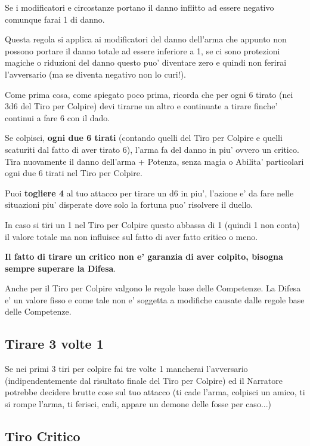 \documentclass[a4paper,11pt,twoside,openany]{book}
\begin{document}
Se i modificatori e circostanze portano il danno inflitto ad essere negativo comunque farai 1 di danno.

Questa regola si applica ai modificatori del danno dell'arma che appunto non possono portare il danno totale ad essere inferiore a 1, se ci sono protezioni magiche o riduzioni del danno questo puo' diventare zero e quindi non ferirai l'avversario (ma se diventa negativo non lo curi!).

Come prima cosa, come spiegato poco prima, ricorda che per ogni 6 tirato (nei 3d6 del Tiro per Colpire) devi tirarne un altro e continuate a tirare finche' continui a fare 6 con il dado.

Se colpisci, \textbf{ogni due 6 tirati} (contando quelli del Tiro per Colpire e quelli scaturiti dal fatto di aver tirato 6), l'arma fa del danno in piu' ovvero un critico. Tira nuovamente il danno dell'arma + Potenza, senza magia o Abilita' particolari ogni due 6 tirati nel Tiro per Colpire.

Puoi \textbf{togliere 4} al tuo attacco per tirare un d6 in piu', l'azione e' da fare nelle situazioni piu' disperate dove solo la fortuna puo' risolvere il duello.

In caso si tiri un 1 nel Tiro per Colpire questo abbassa di 1 (quindi 1 non conta) il valore totale ma non influisce sul fatto di aver fatto critico o meno.

\textbf{Il fatto di tirare un critico non e' garanzia di aver colpito,
bisogna sempre superare la Difesa}.

Anche per il Tiro per Colpire valgono le regole base delle Competenze.
La Difesa e' un valore fisso e come tale non e' soggetta a modifiche
causate dalle regole base delle Competenze.

\subsection{Tirare 3 volte 1}

Se nei primi 3 tiri per colpire fai tre volte 1 mancherai l'avversario (indipendentemente dal risultato finale del Tiro per Colpire) ed il Narratore potrebbe decidere brutte cose sul tuo attacco (ti cade l'arma, colpisci un amico, ti si rompe l'arma, ti ferisci, cadi, appare un demone delle fosse per caso...)

\subsection{Tiro Critico}
\end{document}
